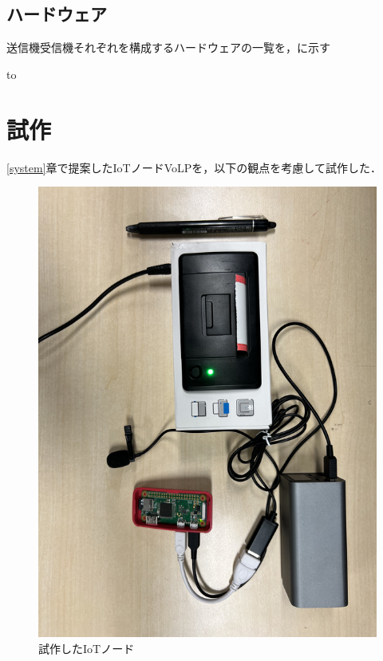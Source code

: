 \documentclass[submit,techrep,noauthor]{ipsj}
\begin{document}
\subsection{ハードウェア}
送信機受信機それぞれを構成するハードウェアの一覧を，に示す

\begin{table}[tb] 
\caption{ハードウェア一覧} 
\label{tab:sys-hardwares}
\hbox to
\end{table}

\section{試作}
\ref{system}章で提案したIoTノードVoLPを，以下の観点を考慮して試作した．

\begin{figure}[tb]
\includegraphics[scale=0.35,bb= 0 0 2000 1000]{image/device.png}
\caption{試作したIoTノード}
\label{fig:device}
\end{figure}
\end{document}
